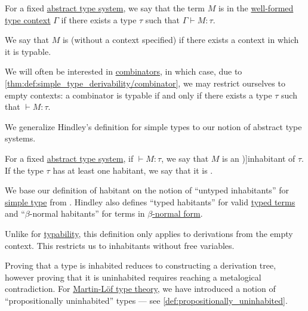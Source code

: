 \begin{definition}\label{def:typability}
  For a fixed \hyperref[def:abstract_type_system]{abstract type system}, we say that the term \( M \) is  in the \hyperref[rem:well_formed_context]{well-formed} \hyperref[def:type_context]{type context} \( \Gamma \) if there exists a type \( \tau \) such that \( \Gamma \vdash M: \tau \).

  We say that \( M \) is  (without a context specified) if there exists a context in which it is typable.
\end{definition}
\begin{comments}
  \item We will often be interested in \hyperref[def:lambda_combinator]{combinators}, in which case, due to \cref{thm:def:simple_type_derivability/combinator}, we may restrict ourselves to empty contexts: a combinator is typable if and only if there exists a type \( \tau \) such that \( \vdash M: \tau \).

  \item We generalize Hindley's definition for simple types to our notion of abstract type systems.
\end{comments}

\begin{definition}\label{def:type_habitation}
  For a fixed \hyperref[def:abstract_type_system]{abstract type system}, if \( \vdash M: \tau \), we say that \( M \) is an \term[en=untyped inhabitant (\cite[8A1]{Hindley1997BasicSTT})]{inhabitant} of \( \tau \). If the type \( \tau \) has at least one habitant, we say that it is .
\end{definition}
\begin{comments}
  \item We base our definition of habitant on the notion of \enquote{untyped inhabitants} for \hyperref[def:simple_type]{simple type} from \cite[def. 8A1]{Hindley1997BasicSTT}. Hindley also defines \enquote{typed habitants} for valid \hyperref[def:typed_lambda_term]{typed terms} and \enquote{\( \beta \)-normal habitants} for terms in \hyperref[def:lambda_term_normal_form]{\( \beta \)-normal form}.

  \item Unlike for \hyperref[def:typability]{typability}, this definition only applies to derivations from the empty context. This restricts us to inhabitants without free variables.

  \item Proving that a type is inhabited reduces to constructing a derivation tree, however proving that it is uninhabited requires reaching a metalogical contradiction. For \hyperref[def:martin_lof_type_theory]{Martin-L\"of type theory}, we have introduced a notion of \enquote{propositionally uninhabited} types --- see \cref{def:propositionally_uninhabited}.
\end{comments}

